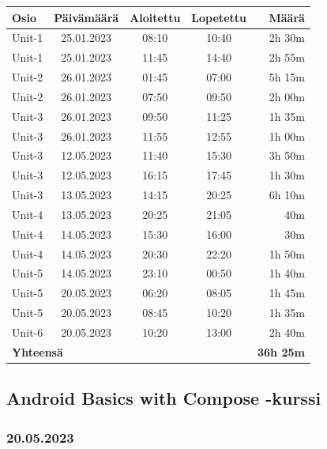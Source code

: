 \begin{table}[H]
  \centering
  \label{tab:android-basics-in-kotlin-working-hours}
  \begin{tabular*}{\linewidth}{@{\extracolsep{\fill}} l c c c r }
    \textbf{Osio} & \textbf{Päivämäärä} & \textbf{Aloitettu} & \textbf{Lopetettu} & \textbf{Määrä} \\
    \hline
    Unit-1 & 25.01.2023 & 08:10 & 10:40 & 2h 30m \\
    Unit-1 & 25.01.2023 & 11:45 & 14:40 & 2h 55m \\
    Unit-2 & 26.01.2023 & 01:45 & 07:00 & 5h 15m \\
    Unit-2 & 26.01.2023 & 07:50 & 09:50 & 2h 00m \\
    Unit-3 & 26.01.2023 & 09:50 & 11:25 & 1h 35m \\
    Unit-3 & 26.01.2023 & 11:55 & 12:55 & 1h 00m \\
    Unit-3 & 12.05.2023 & 11:40 & 15:30 & 3h 50m \\
    Unit-3 & 12.05.2023 & 16:15 & 17:45 & 1h 30m \\
    Unit-3 & 13.05.2023 & 14:15 & 20:25 & 6h 10m \\
    Unit-4 & 13.05.2023 & 20:25 & 21:05 &    40m \\
    Unit-4 & 14.05.2023 & 15:30 & 16:00 &    30m \\
    Unit-4 & 14.05.2023 & 20:30 & 22:20 & 1h 50m \\
    Unit-5 & 14.05.2023 & 23:10 & 00:50 & 1h 40m \\
    Unit-5 & 20.05.2023 & 06:20 & 08:05 & 1h 45m \\
    Unit-5 & 20.05.2023 & 08:45 & 10:20 & 1h 35m \\
    Unit-6 & 20.05.2023 & 10:20 & 13:00 & 2h 40m \\
    \hline
    \multicolumn{4}{l}{\textbf{Yhteensä}} & \textbf{36h 25m} \\
  \end{tabular*}
\end{table}

\subsection{Android Basics with Compose -kurssi}


\subsubsection{20.05.2023}



